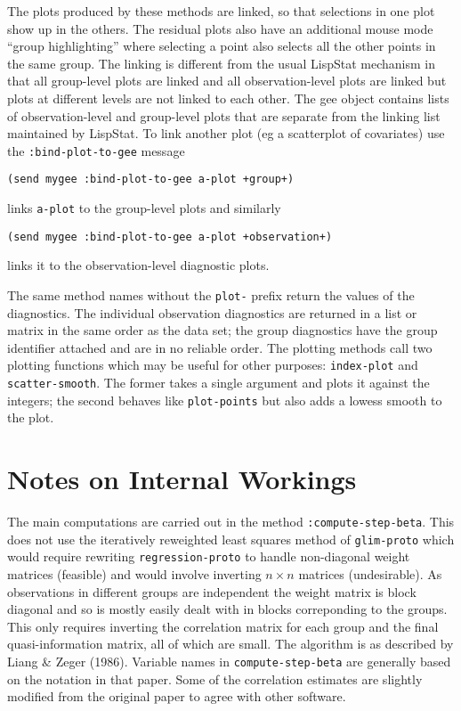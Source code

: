 \documentclass[10pt]{article}
\begin{document}
The plots produced by these methods are linked, so that selections in one plot show up in the others.  The residual plots also have an additional mouse mode ``group highlighting'' where selecting a point also selects all the other points in the same group.  The linking is different from the usual LispStat mechanism in that all group-level plots are linked and all observation-level plots are linked but plots at different levels are not linked to each other.  The gee object contains lists of observation-level and group-level plots that are separate from the linking list maintained by LispStat.  To link another plot (eg a scatterplot of covariates) use the \texttt{:bind-plot-to-gee} message
\begin{verbatim}
(send mygee :bind-plot-to-gee a-plot +group+)
\end{verbatim}
links \texttt{a-plot} to the group-level plots and similarly
\begin{verbatim}
(send mygee :bind-plot-to-gee a-plot +observation+)
\end{verbatim}
links it to the observation-level diagnostic plots.

The same method names without the \texttt{plot-} prefix return the values of the diagnostics.  The individual observation diagnostics are returned in a list or matrix in the same order as the data set; the group diagnostics have the group identifier attached and are in no reliable order. The plotting methods call two plotting functions which may be useful for other purposes: \texttt{index-plot} and \texttt{scatter-smooth}. The former takes a single argument and plots it against the integers; the second behaves like \texttt{plot-points} but also adds a lowess smooth to the plot. 

\section{Notes on Internal Workings}
The main computations are carried out in the method \texttt{:compute-step-beta}. This does not use the iteratively reweighted least squares method of \texttt{glim-proto} which would require rewriting \texttt{regression-proto} to handle non-diagonal weight matrices (feasible) and would involve inverting $n\times n$ matrices (undesirable).  As observations in different groups are independent the weight matrix is block diagonal and so is mostly easily dealt with in blocks correponding to the groups.  This only requires inverting the correlation matrix for each group and the final quasi-information matrix, all of which are small. The algorithm is as described by Liang \& Zeger (1986). Variable names in \texttt{compute-step-beta} are generally based on the notation in that paper. Some of the correlation estimates are slightly modified from the original paper to agree with other software. 
\end{document}
